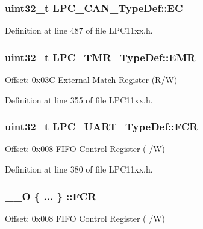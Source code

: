 \subsubsection[{\texorpdfstring{EC}{EC}}]{ uint32\+\_\+t L\+P\+C\+\_\+\+C\+A\+N\+\_\+\+Type\+Def\+::\+EC}\hypertarget{group___l_p_c11xx___definitions_ga2c69811a8a235e77f2066a96610b9f96}{}\label{group___l_p_c11xx___definitions_ga2c69811a8a235e77f2066a96610b9f96}


Definition at line 487 of file L\+P\+C11xx.\+h.

\subsubsection[{\texorpdfstring{E\+MR}{EMR}}]{ uint32\+\_\+t L\+P\+C\+\_\+\+T\+M\+R\+\_\+\+Type\+Def\+::\+E\+MR}\hypertarget{group___l_p_c11xx___definitions_ga3b565bf2661f6ca601c2dad16cc3eca0}{}\label{group___l_p_c11xx___definitions_ga3b565bf2661f6ca601c2dad16cc3eca0}
Offset\+: 0x03C External Match Register (R/W) 

Definition at line 355 of file L\+P\+C11xx.\+h.

\subsubsection[{\texorpdfstring{F\+CR}{FCR}}]{ uint32\+\_\+t L\+P\+C\+\_\+\+U\+A\+R\+T\+\_\+\+Type\+Def\+::\+F\+CR}\hypertarget{group___l_p_c11xx___definitions_ga397726038aebd15c8869a534e08e911b}{}\label{group___l_p_c11xx___definitions_ga397726038aebd15c8869a534e08e911b}
Offset\+: 0x008 F\+I\+FO Control Register ( /W) 

Definition at line 380 of file L\+P\+C11xx.\+h.

\subsubsection[{\texorpdfstring{F\+CR}{FCR}}]{\setlength{\rightskip}{0pt plus 5cm}\+\_\+\+\_\+O \{ ... \} \+::F\+CR}\hypertarget{group___l_p_c11xx___definitions_ga20a60160e51d6a2dc1a5901d55739d4e}{}\label{group___l_p_c11xx___definitions_ga20a60160e51d6a2dc1a5901d55739d4e}
Offset\+: 0x008 F\+I\+FO Control Register ( /W) 

